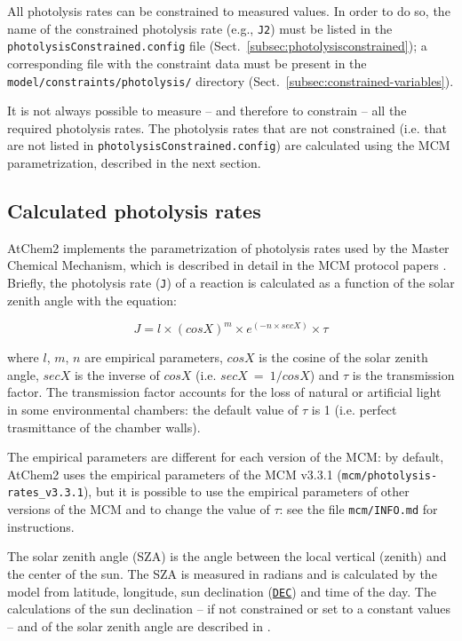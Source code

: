 All photolysis rates can be constrained to measured values. In order
to do so, the name of the constrained photolysis rate (e.g.,
\texttt{J2}) must be listed in the
\texttt{photolysisConstrained.config} file
(Sect.~\ref{subsec:photolysisconstrained}); a corresponding file with
the constraint data must be present in the
\texttt{model/constraints/photolysis/} directory
(Sect.~\ref{subsec:constrained-variables}).

It is not always possible to measure -- and therefore to constrain --
all the required photolysis rates. The photolysis rates that are not
constrained (i.e. that are not listed in
\texttt{photolysisConstrained.config}) are calculated using the MCM
parametrization, described in the next section.

\subsection{Calculated photolysis rates} \label{subsec:calculated-photolysis-rates}

AtChem2 implements the parametrization of photolysis rates used by the
Master Chemical Mechanism, which is described in detail in the MCM
protocol papers \citep{jenkin_1997, saunders_2003}. Briefly, the
photolysis rate (\texttt{J}) of a reaction is calculated as a function
of the solar zenith angle with the equation:

\begin{equation}
  J = l \times (cosX)^m \times e^{(-n \times secX)} \times \tau
\end{equation}

where $l$, $m$, $n$ are empirical parameters, $cosX$ is the cosine of
the solar zenith angle, $secX$ is the inverse of $cosX$ (i.e.
$secX\ =\ 1/cosX$) and $\tau$ is the transmission factor. The
transmission factor accounts for the loss of natural or artificial
light in some environmental chambers: the default value of $\tau$ is 1
(i.e. perfect trasmittance of the chamber walls).

The empirical parameters are different for each version of the MCM: by
default, AtChem2 uses the empirical parameters of the MCM v3.3.1
(\texttt{mcm/photolysis-rates\_v3.3.1}), but it is possible to use the
empirical parameters of other versions of the MCM and to change the
value of $\tau$: see the file \texttt{mcm/INFO.md} for instructions.

The solar zenith angle (SZA) is the angle between the local vertical
(zenith) and the center of the sun. The SZA is measured in radians and
is calculated by the model from latitude, longitude, sun declination
(\hyperref[subsec:dec]{\texttt{DEC}}) and time of the day. The
calculations of the sun declination -- if not constrained or set to a
constant values -- and of the solar zenith angle are described in
\citet{madronich_1993}.

